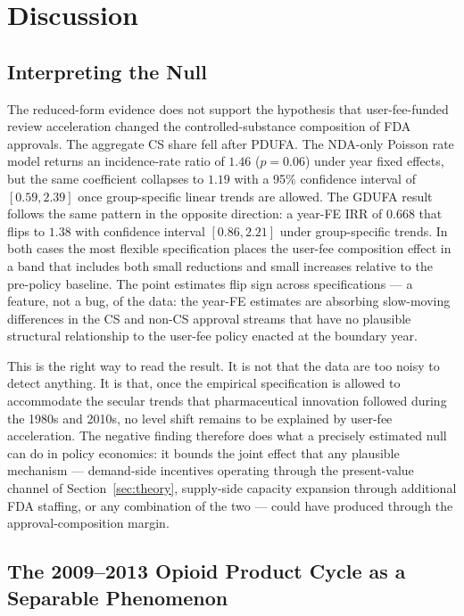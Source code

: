 \section{Discussion}
\label{sec:discussion}

\subsection{Interpreting the Null}

The reduced-form evidence does not support the hypothesis that user-fee-funded review acceleration changed the controlled-substance composition of FDA approvals. The aggregate CS share fell after PDUFA. The NDA-only Poisson rate model returns an incidence-rate ratio of $1.46$ ($p = 0.06$) under year fixed effects, but the same coefficient collapses to $1.19$ with a 95\% confidence interval of $[0.59, 2.39]$ once group-specific linear trends are allowed. The GDUFA result follows the same pattern in the opposite direction: a year-FE IRR of $0.668$ that flips to $1.38$ with confidence interval $[0.86, 2.21]$ under group-specific trends. In both cases the most flexible specification places the user-fee composition effect in a band that includes both small reductions and small increases relative to the pre-policy baseline. The point estimates flip sign across specifications --- a feature, not a bug, of the data: the year-FE estimates are absorbing slow-moving differences in the CS and non-CS approval streams that have no plausible structural relationship to the user-fee policy enacted at the boundary year.

This is the right way to read the result. It is not that the data are too noisy to detect anything. It is that, once the empirical specification is allowed to accommodate the secular trends that pharmaceutical innovation followed during the 1980s and 2010s, no level shift remains to be explained by user-fee acceleration. The negative finding therefore does what a precisely estimated null can do in policy economics: it bounds the joint effect that any plausible mechanism --- demand-side incentives operating through the present-value channel of Section~\ref{sec:theory}, supply-side capacity expansion through additional FDA staffing, or any combination of the two --- could have produced through the approval-composition margin.

\subsection{The 2009--2013 Opioid Product Cycle as a Separable Phenomenon}

